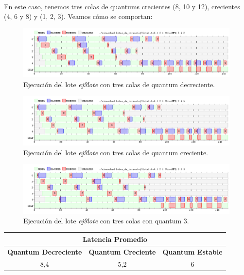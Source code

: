 En este caso, tenemos tres colas de quantums crecientes (8, 10 y 12), crecientes (4, 6 y 8) y (1, 2, 3). Veamos cómo se comportan:

\begin{figure}[!h]
	\begin{center}
		\includegraphics[width=500px]{imagenes/ej9_1.png}
		\caption{Ejecución del lote \emph{ej9lote} con tres colas de quantum decreciente.}
		\label{fig:grafico_ej9_1}
	\end{center}
\end{figure}

\begin{figure}[!h]
	\begin{center}
		\includegraphics[width=500px]{imagenes/ej9_2.png}
		\caption{Ejecución del lote \emph{ej9lote} con tres colas de quantum creciente.}
		\label{fig:grafico_ej9_2}
	\end{center}
\end{figure}

\begin{figure}[!h]
	\begin{center}
		\includegraphics[width=500px]{imagenes/ej9_3.png}
		\caption{Ejecución del lote \emph{ej9lote} con tres colas con quantum 3.}
		\label{fig:grafico_ej9_3}
	\end{center}
\end{figure}

\begin{center}
	\begin{tabular}{|c|c|c|}
		\hline
		\multicolumn{3}{|c|}{\large{\textbf{Latencia Promedio}}} \\
		\hline
		\textbf{Quantum Decreciente} & \textbf{Quantum Creciente} & \textbf{Quantum Estable} \\
		\hline
		8,4 & 5,2 & 6 \\
		\hline
	\end{tabular}
\end{center}


